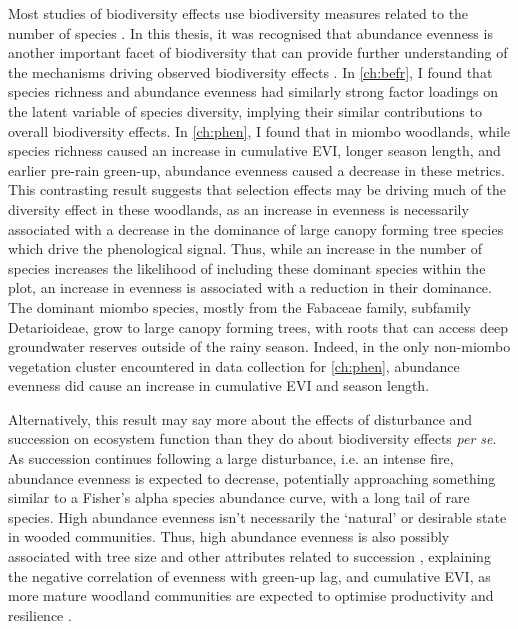 \begin{refsection}
Most studies of biodiversity effects use biodiversity measures related to the number of species \citep{}. In this thesis, it was recognised that abundance evenness is another important facet of biodiversity that can provide further understanding of the mechanisms driving observed biodiversity effects \citep{}. In \autoref{ch:befr}, I found that species richness and abundance evenness had similarly strong factor loadings on the latent variable of species diversity, implying their similar contributions to overall biodiversity effects. In \autoref{ch:phen}, I found that in miombo woodlands, while species richness caused an increase in cumulative EVI, longer season length, and earlier pre-rain green-up, abundance evenness caused a decrease in these metrics. This contrasting result suggests that selection effects may be driving much of the diversity effect in these woodlands, as an increase in evenness is necessarily associated with a decrease in the dominance of large canopy forming tree species which drive the phenological signal. Thus, while an increase in the number of species increases the likelihood of including these dominant species within the plot, an increase in evenness is associated with a reduction in their dominance. The dominant miombo species, mostly from the Fabaceae family, subfamily Detarioideae, grow to large canopy forming trees, with roots that can access deep groundwater reserves outside of the rainy season. Indeed, in the only non-miombo vegetation cluster encountered in data collection for \autoref{ch:phen}, abundance evenness did cause an increase in cumulative EVI and season length.

Alternatively, this result may say more about the effects of disturbance and succession on ecosystem function than they do about biodiversity effects \textit{per se}. As succession continues following a large disturbance, i.e. an intense fire, abundance evenness is expected to decrease, potentially approaching something similar to a Fisher's alpha species abundance curve, with a long tail of rare species. High abundance evenness isn't necessarily the `natural' or desirable state in wooded communities. Thus, high abundance evenness is also possibly associated with tree size and other attributes related to succession \citep{}, explaining the negative correlation of evenness with green-up lag, and cumulative EVI, as more mature woodland communities are expected to optimise productivity and resilience \citep{}.



\end{refsection}
